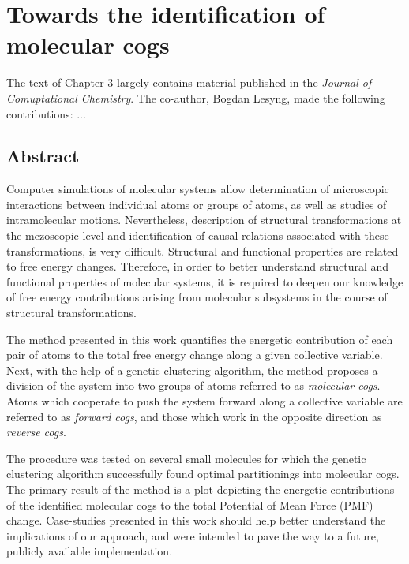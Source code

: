 \documentclass[a4paper,11pt,twoside]{book}%
\begin{document}
\newenvironment{packedenum}
{ \begin{enumerate}
    \setlength{\itemsep}{1.5pt}
    \setlength{\parskip}{1.5pt}
    \setlength{\parsep}{1.5pt}     }
{ \end{enumerate}                  } 


\newcommand{\specialcell}[2][c]{%
  \begin{tabular}[#1]{@{}c@{}}#2\end{tabular}}


  
\chapter{Towards the identification of molecular cogs}

The text of Chapter 3 largely contains material published in the \emph{Journal of Comuptational Chemistry}.
The co-author, Bogdan Lesyng, made the following contributions: ...

\section{Abstract}
Computer simulations of molecular systems allow determination of microscopic interactions between individual atoms or groups of atoms, as well as studies of intramolecular motions. 
Nevertheless, description of structural transformations at the mezoscopic level and identification of causal relations associated with these transformations, is very difficult.
Structural and functional properties are related to free energy changes.
Therefore, in order to better understand structural and functional properties of molecular systems, it is required to deepen our knowledge of free energy contributions arising from molecular subsystems in the course of structural transformations.

The method presented in this work quantifies the energetic contribution of each pair of atoms to the total free energy change along a given collective variable.
Next, with the help of a genetic clustering algorithm, the method proposes a division of the system into two groups of atoms referred to as \emph{molecular cogs}.
Atoms which cooperate to push the system forward along a collective variable are referred to as \emph{forward cogs}, and those which work in the opposite direction as \emph{reverse cogs}.

{\color{black}The procedure was tested on several small molecules for which the genetic clustering algorithm successfully found optimal partitionings into molecular cogs.}
The primary result of the method is a {\color{black}plot} depicting the {\color{black}energetic} contributions of the identified molecular cogs to the total Potential of Mean Force (PMF) change.
{\color{black}Case-studies presented in this work should help better understand the implications of our approach, and were intended to pave the way to a future, publicly available implementation.}
\end{document}
